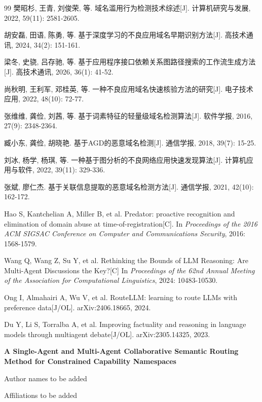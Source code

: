\documentclass[10pt,a4paper,twocolumn,fontset=fandol]{ctexart}
\newcommand{\TitleEN}{A Single-Agent and Multi-Agent Collaborative Semantic Routing Method for Constrained Capability Namespaces}
\begin{document}
\begin{thebibliography}{99}
樊昭杉, 王青, 刘俊荣, 等. 域名滥用行为检测技术综述[J]. 计算机研究与发展, 2022, 59(11): 2581-2605.

胡安磊, 田语, 陈勇, 等. 基于深度学习的不良应用域名早期识别方法[J]. 高技术通讯, 2024, 34(2): 151-161.

梁冬, 史骁, 吕存驰, 等. 基于应用程序接口依赖关系图路径搜索的工作流生成方法[J]. 高技术通讯, 2026, 36(1): 41-52.

尚秋明, 王利军, 邓桂英, 等. 一种不良应用域名快速核验方法的研究[J]. 电子技术应用, 2022, 48(10): 72-77.

张维维, 龚俭, 刘茜, 等. 基于词素特征的轻量级域名检测算法[J]. 软件学报, 2016, 27(9): 2348-2364.

臧小东, 龚俭, 胡晓艳. 基于AGD的恶意域名检测[J]. 通信学报, 2018, 39(7): 15-25.

刘冰, 杨学, 杨琪, 等. 一种基于图分析的不良网络应用快速发现算法[J]. 计算机应用与软件, 2022, 39(11): 329-336.

张斌, 廖仁杰. 基于关联信息提取的恶意域名检测方法[J]. 通信学报, 2021, 42(10): 162-172.

Hao S, Kantchelian A, Miller B, et al.
\newblock Predator: proactive recognition and elimination of domain abuse at time-of-registration[C].
\newblock In \emph{Proceedings of the 2016 ACM SIGSAC Conference on Computer and Communications Security}, 2016: 1568-1579.

Wang Q, Wang Z, Su Y, et al.
\newblock Rethinking the Bounds of LLM Reasoning: Are Multi-Agent Discussions the Key?[C]
\newblock In \emph{Proceedings of the 62nd Annual Meeting of the Association for Computational Linguistics}, 2024: 10483-10530.

Ong I, Almahairi A, Wu V, et al.
\newblock RouteLLM: learning to route LLMs with preference data[J/OL].
\newblock arXiv:2406.18665, 2024.

Du Y, Li S, Torralba A, et al.
\newblock Improving factuality and reasoning in language models through multiagent debate[J/OL].
\newblock arXiv:2305.14325, 2023.

\end{thebibliography}

\vspace{0.6em}
\begin{center}
{\bfseries \TitleEN\par}
\vspace{0.6em}
{\small Author names to be added\par}
{\small Affiliations to be added\par}
\end{center}
\end{document}
